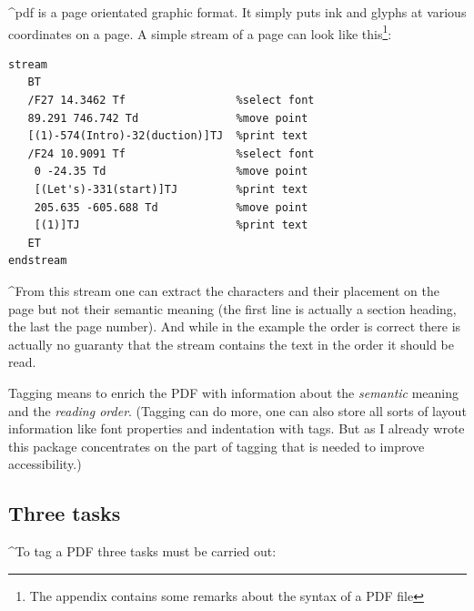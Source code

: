 \documentclass[DIV=12,parskip=half-,bibliography=totoc]{scrartcl}
\newcommand\PDF{PDF}
\begin{document}
\TagP^pdf is a page orientated graphic format. It simply puts ink and glyphs at various coordinates on a page. A simple stream of a page can look like this\footnote{The appendix contains some remarks about the syntax of a \PDF{} file}:
\TagPend

\begin{lstlisting}[columns=fixed]
stream
   BT
   /F27 14.3462 Tf                 %select font
   89.291 746.742 Td               %move point
   [(1)-574(Intro)-32(duction)]TJ  %print text
   /F24 10.9091 Tf                 %select font
    0 -24.35 Td                    %move point
    [(Let's)-331(start)]TJ         %print text
    205.635 -605.688 Td            %move point
    [(1)]TJ                        %print text
   ET
endstream
\end{lstlisting}
\tagmcend\tagstructend

\TagP^From this stream one can extract the characters and their placement on the page but not their semantic meaning  (the first line is actually a section heading, the last the page number). And while in the example the order is correct there is actually no guaranty that the stream contains the text in the order it should be read.

\TagP Tagging means to enrich the \PDF{} with information about the \emph{semantic} meaning and the \emph{reading order}. (Tagging can do more, one can also store all sorts of layout information like font properties and indentation with tags. But as I already wrote this package concentrates on the part of tagging that is needed to improve accessibility.)\TagPend




\subsection{Three tasks}
\TagP^To tag a \PDF{} three tasks must be  carried out:\TagPend
\end{document}
